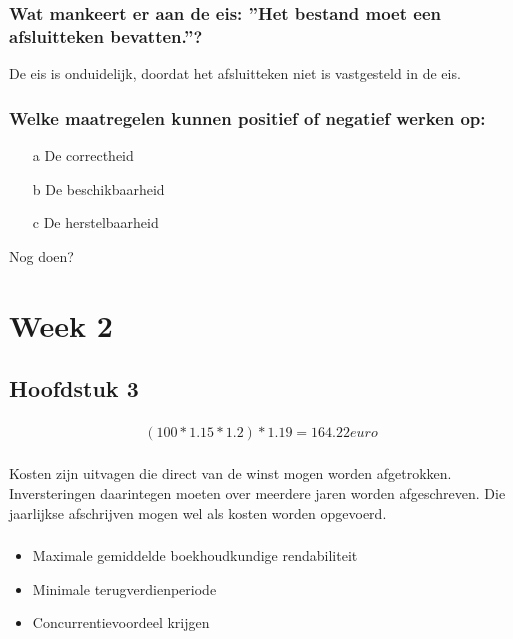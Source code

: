 \documentclass[a4paper,titlepage]{artikel1}
\begin{document}
\subsubsection[Opdracht 9]{Wat mankeert er aan de eis: ''Het bestand moet een afsluitteken bevatten.''?}
De eis is onduidelijk, doordat het afsluitteken niet is vastgesteld in de eis. 

\subsubsection[Opdracht 10]{Welke maatregelen kunnen positief of negatief werken op:}
\begin{itemize}
\item[a] De correctheid
\item[b] De beschikbaarheid
\item[c] De herstelbaarheid
\end{itemize}
Nog doen?

\section{Week 2}
\subsection{Hoofdstuk 3}
\subsubsection[Opdracht 1]{}
\begin{displaymath}
(100*1.15*1.2)*1.19={164.22}euro
\end{displaymath}

\subsubsection[Opdracht 2]{}
Kosten zijn uitvagen die direct van de winst mogen worden afgetrokken. Inversteringen daarintegen moeten over meerdere jaren worden afgeschreven. Die jaarlijkse afschrijven mogen wel als kosten worden opgevoerd.

\subsubsection[Opdracht 3]{}
\begin{itemize}
\item Maximale gemiddelde boekhoudkundige rendabiliteit
\item Minimale terugverdienperiode
\item Concurrentievoordeel krijgen
\end{itemize}
\end{document}
